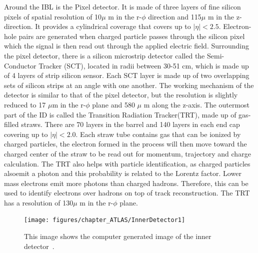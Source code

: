 Around the IBL is the Pixel detector. It is made of three layers of fine silicon pixels of spatial resolution of 10$\mu$ m in the r-$\phi$ direction and 115$\mu$ m in the z-direction. It provides a cylindrical coverage that covers up to $|\eta|<2.5$. Electron-hole pairs are generated when charged particle passes through the silicon pixel which the signal is then read out through the applied electric field.
Surrounding the pixel detector, there is a silicon microstrip detector called the Semi-Conductor Tracker (SCT), located in radii between 30-51 cm, which is made up of 4 layers of strip silicon sensor. Each SCT layer is made up of two overlapping sets of silicon strips at an angle with one another. The working mechanism of the detector is similar to that of the pixel detector, but the resolution is slightly reduced to 17 $\mu$m in the r-$\phi$ plane and 580 $\mu$ m along the z-axis. 
The outermost part of the ID is called the Transition Radiation Tracker(TRT), made up of gas-filled straws. There are 70 layers in the barrel and 140 layers in each end cap covering up to $|\eta|<2.0$. Each straw tube contains gas that can be ionized by charged particles, the electron formed in the process will then move toward the charged center of the straw to be read out for momentum, trajectory and charge calculation. The TRT also helps with particle identification, as charged particles alsoemit a photon and this probability is related to the Lorentz factor. Lower mass electrons emit more photons than charged hadrons. Therefore, this can be used to identify electrons over hadrons on top of track reconstruction. The TRT has a resolution of 130$\mu$ m in the r-$\phi$ plane.

\begin{figure}[!htb]
    \begin{center}
        \texttt{[image: figures/chapter\_ATLAS/InnerDetector1]}
        \caption{
            This image shows the computer generated image of the inner detector~\cite{Pequenao:1095926}.
        }
        \label{fig:InnerDetector}
    \end{center}
\end{figure}


